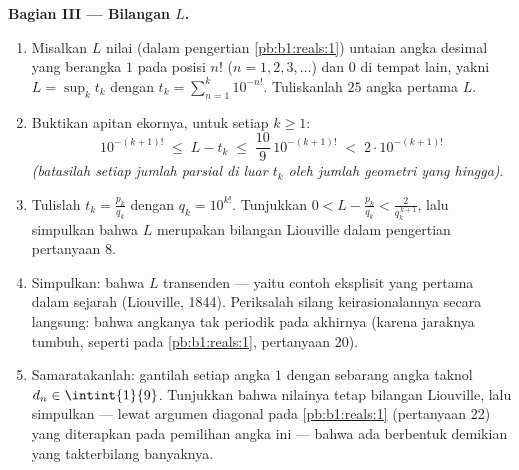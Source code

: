 \begin{problem}
\medskip
\noindent\textbf{Bagian III --- Bilangan $L$.}
\begin{enumerate}[resume]
  \item Misalkan $L$ nilai (dalam pengertian
        \cref{pb:b1:reals:1}) untaian angka desimal yang berangka
        $1$ pada posisi $n!$ ($n = 1, 2, 3, \dots$)
        dan $0$ di tempat lain, yakni $L = \sup_k t_k$ dengan $t_k =
        \sum_{n=1}^{k} 10^{-n!}$. Tuliskanlah $25$ angka
        pertama $L$.
  \item Buktikan apitan ekornya, untuk setiap $k \geq 1$:
        \[
        10^{-(k+1)!} \;\leq\; L - t_k \;\leq\;
        \frac{10}{9}\,10^{-(k+1)!} \;<\; 2\cdot 10^{-(k+1)!}
        \]
        \emph{(batasilah setiap jumlah parsial di luar $t_k$ oleh jumlah
        geometri yang hingga)}.
  \item Tulislah $t_k = \frac{p_k}{q_k}$ dengan $q_k = 10^{k!}$.
        Tunjukkan $0 < L - \frac{p_k}{q_k} < \frac{2}{q_k^{\,k+1}}$,
        lalu simpulkan bahwa $L$ merupakan bilangan Liouville dalam pengertian
        pertanyaan 8.
  \item Simpulkan: bahwa $L$ transenden --- yaitu contoh eksplisit
        yang pertama dalam sejarah (Liouville, 1844). Periksalah silang
        keirasionalannya secara langsung: bahwa angkanya tak periodik pada
        akhirnya (karena jaraknya tumbuh, seperti pada \cref{pb:b1:reals:1},
        pertanyaan 20).
  \item Samaratakanlah: gantilah setiap angka $1$ dengan sebarang
        angka taknol $d_n \in \intint{1}{9}$. Tunjukkan bahwa nilainya
        tetap bilangan Liouville, lalu simpulkan --- lewat argumen diagonal
        pada \cref{pb:b1:reals:1} (pertanyaan 22) yang diterapkan
        pada pemilihan angka ini --- bahwa ada 
        berbentuk demikian yang takterbilang banyaknya.
\end{enumerate}


\end{problem}
